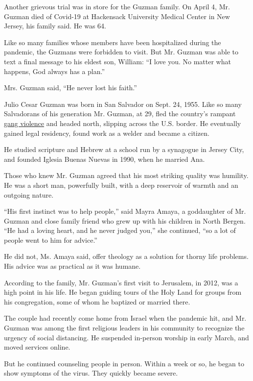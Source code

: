 Another grievous trial was in store for the Guzman family. On April 4,
Mr. Guzman died of Covid-19 at Hackensack University Medical Center in
New Jersey, his family said. He was 64.

Like so many families whose members have been hospitalized during the
pandemic, the Guzmans were forbidden to visit. But Mr. Guzman was able
to text a final message to his eldest son, William: ``I love you. No
matter what happens, God always has a plan.''

Mrs. Guzman said, ``He never lost his faith.''

Julio Cesar Guzman was born in San Salvador on Sept. 24, 1955. Like so
many Salvadorans of his generation Mr. Guzman, at 29, fled the country's
rampant
\href{https://www.nytimes.com/2018/12/10/us/el-salvador-ms-13.html}{gang
violence} and headed north, slipping across the U.S. border. He
eventually gained legal residency, found work as a welder and became a
citizen.

He studied scripture and Hebrew at a school run by a synagogue in Jersey
City, and founded Iglesia Buenas Nuevas in 1990, when he married Ana.

Those who knew Mr. Guzman agreed that his most striking quality was
humility. He was a short man, powerfully built, with a deep reservoir of
warmth and an outgoing nature.

``His first instinct was to help people,'' said Mayra Amaya, a
goddaughter of Mr. Guzman and close family friend who grew up with his
children in North Bergen. ``He had a loving heart, and he never judged
you,'' she continued, ``so a lot of people went to him for advice.''

He did not, Ms. Amaya said, offer theology as a solution for thorny life
problems. His advice was as practical as it was humane.

According to the family, Mr. Guzman's first visit to Jerusalem, in 2012,
was a high point in his life. He began guiding tours of the Holy Land
for groups from his congregation, some of whom he baptized or married
there.

The couple had recently come home from Israel when the pandemic hit, and
Mr. Guzman was among the first religious leaders in his community to
recognize the urgency of social distancing. He suspended in-person
worship in early March, and moved services online.

But he continued counseling people in person. Within a week or so, he
began to show symptoms of the virus. They quickly became severe.

